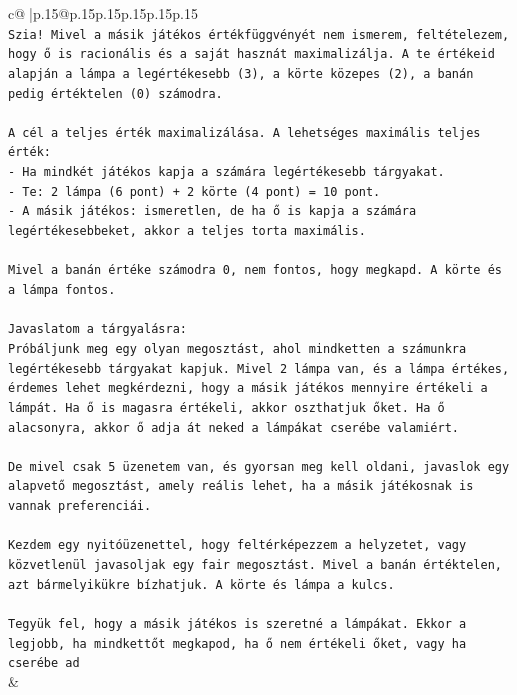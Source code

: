 \documentclass{article}
\begin{document}
{\begin{supertabular}{c@{$\;$}|p{.15\linewidth}@{}p{.15\linewidth}p{.15\linewidth}p{.15\linewidth}p{.15\linewidth}p{.15\linewidth}}
{{{\\ 
\texttt{Szia! Mivel a másik játékos értékfüggvényét nem ismerem, feltételezem, hogy ő is racionális és a saját hasznát maximalizálja. A te értékeid alapján a lámpa a legértékesebb (3), a körte közepes (2), a banán pedig értéktelen (0) számodra.} \\
\\ 
\texttt{A cél a teljes érték maximalizálása. A lehetséges maximális teljes érték:} \\
\texttt{{-} Ha mindkét játékos kapja a számára legértékesebb tárgyakat.} \\
\texttt{{-} Te: 2 lámpa (6 pont) + 2 körte (4 pont) = 10 pont.} \\
\texttt{{-} A másik játékos: ismeretlen, de ha ő is kapja a számára legértékesebbeket, akkor a teljes torta maximális.} \\
\\ 
\texttt{Mivel a banán értéke számodra 0, nem fontos, hogy megkapd. A körte és a lámpa fontos.} \\
\\ 
\texttt{Javaslatom a tárgyalásra:} \\
\texttt{Próbáljunk meg egy olyan megosztást, ahol mindketten a számunkra legértékesebb tárgyakat kapjuk. Mivel 2 lámpa van, és a lámpa értékes, érdemes lehet megkérdezni, hogy a másik játékos mennyire értékeli a lámpát. Ha ő is magasra értékeli, akkor oszthatjuk őket. Ha ő alacsonyra, akkor ő adja át neked a lámpákat cserébe valamiért.} \\
\\ 
\texttt{De mivel csak 5 üzenetem van, és gyorsan meg kell oldani, javaslok egy alapvető megosztást, amely reális lehet, ha a másik játékosnak is vannak preferenciái.} \\
\\ 
\texttt{Kezdem egy nyitóüzenettel, hogy feltérképezzem a helyzetet, vagy közvetlenül javasoljak egy fair megosztást. Mivel a banán értéktelen, azt bármelyikükre bízhatjuk. A körte és lámpa a kulcs.} \\
\\ 
\texttt{Tegyük fel, hogy a másik játékos is szeretné a lámpákat. Ekkor a legjobb, ha mindkettőt megkapod, ha ő nem értékeli őket, vagy ha cserébe ad} \\
            }
        }
    }
    & \\ \\


\end{supertabular}}
\end{document}
